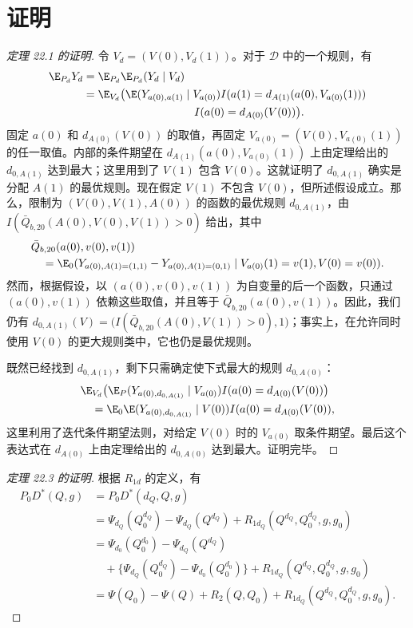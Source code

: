 \section{证明}

\begin{proof}[定理 22.1 的证明]
令 $V_d=(V(0),V_d(1))$。对于 $\mathcal D$ 中的一个规则，有
\[
\begin{aligned}
 \E_{P_d}Y_d
 &=\E_{P_d}\E_{P_d}(Y_d\mid V_d)\\
 &=\E_{V_d}\bigl(\E(Y_{a(0),a(1)}\mid V_{a(0)})
 I(a(1)=d_{A(1)}(a(0),V_{a(0)}(1)))\\
 &\hspace{3.5cm}I(a(0)=d_{A(0)}(V(0))\bigr).
\end{aligned}
\]
固定 $a(0)$ 和 $d_{A(0)}(V(0))$ 的取值，再固定 $V_{a(0)}=(V(0),V_{a(0)}(1))$ 的任一取值。内部的条件期望在 $d_{A(1)}(a(0),V_{a(0)}(1))$ 上由定理给出的 $d_{0,A(1)}$ 达到最大；这里用到了 $V(1)$ 包含 $V(0)$。这就证明了 $d_{0,A(1)}$ 确实是分配 $A(1)$ 的最优规则。现在假定 $V(1)$ 不包含 $V(0)$，但所述假设成立。那么，限制为 $(V(0),V(1),A(0))$ 的函数的最优规则 $d_{0,A(1)}$，由 $I(\bar Q_{b,20}(A(0),V(0),V(1))>0)$ 给出，其中
\[
\begin{aligned}
 &\bar Q_{b,20}(a(0),v(0),v(1))\\
 &\quad=\E_0(Y_{a(0),A(1)=(1,1)}-Y_{a(0),A(1)=(0,1)}
 \mid V_{a(0)}(1)=v(1),V(0)=v(0)).
\end{aligned}
\]
然而，根据假设，以 $(a(0),v(0),v(1))$ 为自变量的后一个函数，只通过 $(a(0),v(1))$ 依赖这些取值，并且等于 $\bar Q_{b,20}(a(0),v(1))$。因此，我们仍有
$d_{0,A(1)}(V)=\bigl(I(\bar Q_{b,20}(A(0),V(1))>0),1\bigr)$；事实上，在允许同时使用 $V(0)$ 的更大规则类中，它也仍是最优规则。

既然已经找到 $d_{0,A(1)}$，剩下只需确定使下式最大的规则 $d_{0,A(0)}$：
\[
\begin{aligned}
 &\E_{V_d}\bigl(\E_P(Y_{a(0),d_{0,A(1)}}\mid V_{a(0)})
 I(a(0)=d_{A(0)}(V(0))\bigr)\\
 &\quad=\E_0\E(Y_{a(0),d_{0,A(1)}}\mid V(0))
 I(a(0)=d_{A(0)}(V(0)),
\end{aligned}
\]
这里利用了迭代条件期望法则，对给定 $V(0)$ 时的 $V_{a(0)}$ 取条件期望。最后这个表达式在 $d_{A(0)}$ 上由定理给出的 $d_{0,A(0)}$ 达到最大。证明完毕。
\end{proof}

\begin{proof}[定理 22.3 的证明]
根据 $R_{1d}$ 的定义，有
\[
\begin{aligned}
 P_0D^*(Q,g)
 &=P_0D^*(d_Q,Q,g)\\
 &=\Psi_{d_Q}(Q_0^{d_Q})-\Psi_{d_Q}(Q^{d_Q})
 +R_{1d_Q}(Q^{d_Q},Q_0^{d_Q},g,g_0)\\
 &=\Psi_{d_0}(Q_0^{d_0})-\Psi_{d_Q}(Q^{d_Q})\\
 &\quad+\{\Psi_{d_Q}(Q_0^{d_Q})-\Psi_{d_0}(Q_0^{d_0})\}
 +R_{1d_Q}(Q^{d_Q},Q_0^{d_Q},g,g_0)\\
 &=\Psi(Q_0)-\Psi(Q)+R_2(Q,Q_0)
 +R_{1d_Q}(Q^{d_Q},Q_0^{d_Q},g,g_0).
\end{aligned}
\]
\end{proof}

